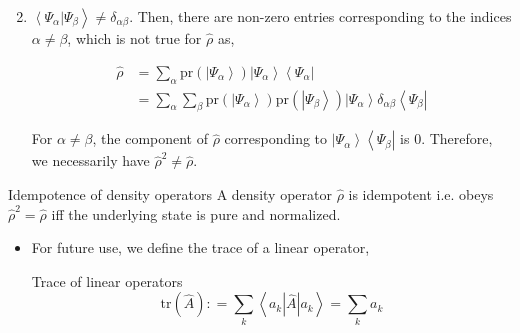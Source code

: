 \documentclass[9pt,handout]{beamer}
\newcommand{\pr}[0]{\text{pr}}
\newcommand{\tr}[0]{\text{tr}}
\begin{document}
\begin{frame}{}
\begin{enumerate}
\setcounter{enumi}{1}
\item $\left\langle \Psi_\alpha \right\rvert \left. \Psi_\beta \right\rangle \neq \delta_{\alpha \beta}$. Then, there are non-zero entries corresponding to the indices $\alpha \neq \beta$, which is not true for $\widehat{\rho}$ as,

\begin{align*}
\widehat{\rho} & = \sum_{\alpha} \pr \left( \left\lvert \Psi_\alpha \right\rangle \right) \left\lvert \Psi_\alpha \right\rangle \left\langle \Psi_\alpha \right\rvert \\
& = \sum_\alpha \sum_\beta \pr \left( \left\lvert \Psi_\alpha \right\rangle \right) \pr \left( \left\lvert \Psi_\beta \right\rangle \right) \left\lvert \Psi_\alpha \right\rangle \delta_{\alpha \beta} \left\langle \Psi_\beta \right\rvert
\end{align*}

For $\alpha \neq \beta$, the component of $\widehat{\rho}$ corresponding to $\left\lvert \Psi_\alpha \right\rangle \left\langle \Psi_\beta \right\rvert$ is $0$. Therefore, we necessarily have $\widehat{\rho}^2 \neq \widehat{\rho}$.
\end{enumerate}

\begin{block}{Idempotence of density operators}
A density operator $\widehat{\rho}$ is idempotent i.e. obeys $\widehat{\rho}^2 = \widehat{\rho}$ iff the underlying state is pure and normalized.
\end{block}

\begin{itemize}
\item For future use, we define the trace of a linear operator,

\begin{block}{Trace of linear operators}
$$\tr \left( \widehat{A} \right) : = \sum_k \left\langle a_k \left\lvert \widehat{A} \right\rvert a_k \right\rangle = \sum_k a_k$$
\end{block}
\end{itemize}
\end{frame}
\end{document}
